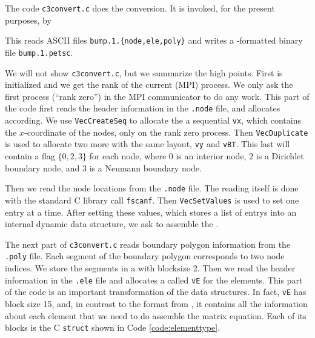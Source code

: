 The code \texttt{c3convert.c} does the conversion.  It is invoked, for the present purposes, by
This reads ASCII files \texttt{bump.1.\{node,ele,poly\}} and writes a \PETSc-formatted binary file \texttt{bump.1.petsc}.

We will not show \texttt{c3convert.c}, but we summarize the high points.  First \PETSc is initialized and we get the rank of the current (MPI) process.  We only ask the first process (``rank zero'') in the MPI communicator to do any work.  This part of the code first reads the header information in the \texttt{.node} file, and allocates \PETSc \pVecs according.  We use \texttt{VecCreateSeq} to allocate the a sequential \pVec \texttt{vx}, which contains the $x$-coordinate of the nodes, only on the rank zero process.  Then \texttt{VecDuplicate} is used to allocate two more \pVecs with the same layout, \texttt{vy} and \texttt{vBT}.  This last \pVec will contain a flag $\{0,2,3\}$ for each node, where $0$ is an interior node, $2$ is a Dirichlet boundary node, and $3$ is a Neumann boundary node.

Then we read the node locations from the \texttt{.node} file.  The reading itself is done with the standard C library call \texttt{fscanf}.  Then \texttt{VecSetValues} is used to set one entry at a time.  After setting these values, which stores a list of entrys into an internal \PETSc dynamic data structure, we ask \PETSc to assemble the \pVecs.

The next part of \texttt{c3convert.c} reads boundary polygon information from the \texttt{.poly} file.  Each segment of the boundary polygon corresponds to two node indices.  We store the segments in a \pVec with blocksize 2.  Then we read the header information in the \texttt{.ele} file and allocates a \pVec called \texttt{vE} for the elements.  This part of the code is an important transformation of the data structures.  In fact, \texttt{vE} has block size 15, and, in contrast to the format from \Triangle, it contains all the information about each element that we need to do assemble the matrix equation.  Each of its blocks is the C \texttt{struct} shown in Code \ref{code:elementtype}.

